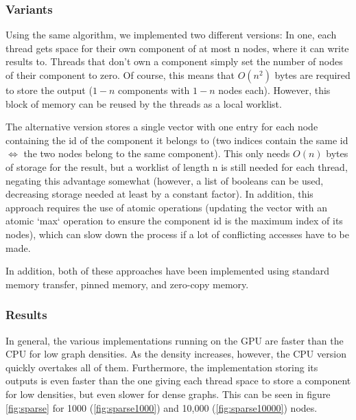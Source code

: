 \documentclass[letta4 paper]{article}
\numberwithin{equation}{section}
\newcommand{\0}{\mathbf{0}}
\begin{document}
\subsubsection{Variants}
Using the same algorithm, we implemented two different versions: In one, each
thread gets space for their own component of at most n nodes, where it can
write results to. Threads that don't own a component simply set the number of
nodes of their component to zero. Of course, this means that $O(n^2)$ bytes
are required to store the output ($1-n$ components with $1-n$ nodes
each). However, this block of memory can be reused by the threads as a local
worklist.

The alternative version stores a single vector with one entry for each node
containing the id of the component it belongs to (two indices contain the same
id $\Leftrightarrow$ the two nodes belong to the same component). This only
needs $O(n)$ bytes of storage for the result, but a worklist of length n is
still needed for each thread, negating this advantage somewhat (however, a
list of booleans can be used, decreasing storage needed at least by a constant
factor). In addition, this approach requires the use of atomic operations
(updating the vector with an atomic `max` operation to ensure the component id
is the maximum index of its nodes), which can slow down the process if a lot
of conflicting accesses have to be made.

In addition, both of these approaches have been implemented using standard
memory transfer, pinned memory, and zero-copy memory.

\subsubsection{Results}
In general, the various implementations running on the GPU are faster than the
CPU for low graph densities. As the density increases, however, the CPU
version quickly overtakes all of them. Furthermore, the implementation storing
its outputs is even faster than the one giving each thread space to store a
component for low densities, but even slower for dense graphs. This can be seen in figure \ref{fig:sparse} for 1000 (\ref{fig:sparse1000}) and 10,000 (\ref{fig:sparse10000}) nodes.
\end{document}
